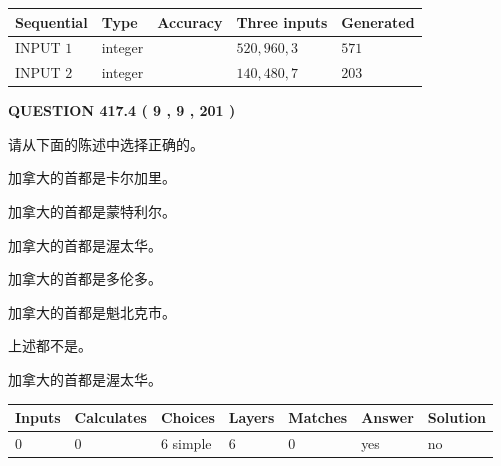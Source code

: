 \documentclass{ctexart}
\begin{document}
   
  
  
\noindent\begin{tabular}{|l|l|l|l|l|}
\hline
 Sequential & Type & Accuracy & Three inputs & Generated \\ 
\hline
 
 
  INPUT $  1 $ & integer &  & $
 520
 , 
 960
 , 
 3
 $ & $ 571 $ 
 \\  \hline  
 
 
  INPUT $  2 $ & integer &  & $
 140
 , 
 480
 , 
 7
 $ & $ 203 $ 
 \\  \hline  
 \end{tabular}
   
   
  
\vspace{0.2in}
  
{\textbf{\Large{QUESTION
417.4 
 ( 9 , 9 , 201 )
}}}
  
  
请从下面的陈述中选择正确的。
 
 
加拿大的首都是卡尔加里。
 
 
加拿大的首都是蒙特利尔。
 
 
加拿大的首都是渥太华。
 
 
加拿大的首都是多伦多。
 
 
加拿大的首都是魁北克市。
 
 
 上述都不是。
 
 
\noindent{}
 
 
加拿大的首都是渥太华。
 
 
\noindent{}
 
 
   
   
   
   
\noindent\begin{tabular}{|l|l|l|l|l|l|l|}
 \hline
Inputs & Calculates & Choices & Layers & Matches & Answer & Solution \\ \hline
 0  & 
 0  & 
 6
  simple  
  & 
 6  & 
 0  & 
  yes & 
  no 
  \\ \hline
 \end{tabular}
   
   
   
   
\noindent{}
   
\end{document}
